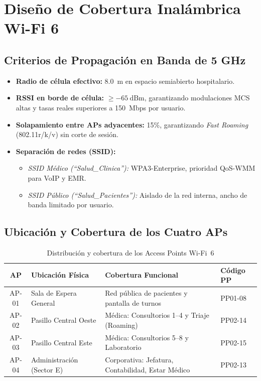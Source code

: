 \section{Diseño de Cobertura Inalámbrica Wi-Fi 6}

\subsection{Criterios de Propagación en Banda de 5 GHz}

\begin{itemize}[leftmargin=*]
    \item \textbf{Radio de célula efectivo:} 8.0~m en espacio semiabierto hospitalario.
    \item \textbf{RSSI en borde de célula:} $\geq -65~\text{dBm}$, garantizando modulaciones MCS altas y tasas reales superiores a 150~Mbps por usuario.
    \item \textbf{Solapamiento entre APs adyacentes:} 15\%, garantizando \textit{Fast Roaming} (802.11r/k/v) sin corte de sesión.
    \item \textbf{Separación de redes (SSID):}
    \begin{itemize}
        \item \textit{SSID Médico (``Salud\_Clinica''):} WPA3-Enterprise, prioridad QoS-WMM para VoIP y EMR.
        \item \textit{SSID Público (``Salud\_Pacientes''):} Aislado de la red interna, ancho de banda limitado por usuario.
    \end{itemize}
\end{itemize}

\subsection{Ubicación y Cobertura de los Cuatro APs}

\begin{table}[H]
\centering
\caption{Distribución y cobertura de los Access Points Wi-Fi~6}
\small
\begin{tabularx}{\textwidth}{@{}clXl@{}}
\toprule
\textbf{AP} & \textbf{Ubicación Física} & \textbf{Cobertura Funcional} & \textbf{Código PP} \\
\midrule
AP-01 & Sala de Espera General     & Red pública de pacientes y pantalla de turnos & PP01-08 \\
AP-02 & Pasillo Central Oeste      & Médica: Consultorios 1--4 y Triaje (Roaming) & PP02-14 \\
AP-03 & Pasillo Central Este       & Médica: Consultorios 5--8 y Laboratorio       & PP02-15 \\
AP-04 & Administración (Sector E)  & Corporativa: Jefatura, Contabilidad, Estar Médico & PP02-13 \\
\bottomrule
\end{tabularx}
\label{tab:aps}
\end{table}

